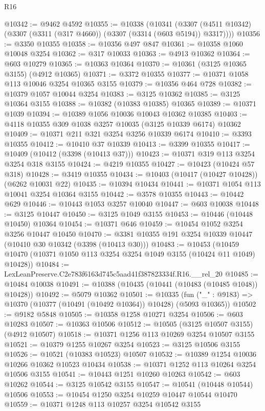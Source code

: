 \begin{lexlean}{R16}
\begin{coremodule}
@10342 := @9462 @4592
@10355 := @10338
    (@10341 (@3307 (@4511 @10342) (@3307 (@3311 (@317 @4660)) (@3307 (@3314 (@603 @5194)) @3317))))
@10356 := @3350 @10355
@10358 := @10356 @497 @847
@10361 := @10358 @1060 @10048 @3254
@10362 := @317 @10033
@10363 := @4913 @10362
@10364 := @603 @10279
@10365 := @10363 @10364
@10370 := @10361 (@3125 @10365 @3155) (@4912 @10365)
@10371 := @3372 @10355
@10377 := @10371 @1058 @113 @10046 @3254 @10365 @3155
@10379 := @10356 @464 @728
@10382 := @10379 @1057 @10044 @3254
@10383 := @3125 @10362
@10385 := @3125 @10364 @3155
@10388 := @10382 (@10383 @10385) @10365
@10389 := @10371 @1039
@10394 := @10389 @1056 @10036 @10043 @10362 @10385
@10403 := @4118 @10355 @309 @1038 @3257 @10035 (@3125 @10339 @6174) @10362
@10409 := @10371 @211 @321 @3254 @3256 @10339 @6174
@10410 := @3393 @10355
@10412 := @10410 @37 @10339
@10413 := @3399 @10355
@10417 := @10409 (@10412 (@3398 (@10413 @37)))
@10423 := @10371 @319 @113 @3254 @3254 @318 @3155
@10424 := @4219 @10355
@10427 := @10423 (@10424 @57 @318)
@10428 := @3419 @10355
@10434 := @10403 (@10417 (@10427 @10428)) (@6262 @10031 @22)
@10435 := @10394 @10434
@10441 := @10371 @1054 @113 @10041 @3254 @10364 @3155
@10442 := @3578 @10355
@10443 := @10442 @629
@10446 := @10443 @1053 @3257 @10040
@10447 := @603 @10038
@10448 := @3125 @10447
@10450 := @3125 @1049 @3155
@10453 := @10446 (@10448 @10450) @10364
@10454 := @10371 @646
@10459 := @10454 @1052 @3254 @3256 @10447 @10450
@10470 := @3381 @10355 @191 @3254 @10339 @10447 (@10410 @30 @10342 (@3398 (@10413 @30)))
@10483 := @10453
    (@10459 @10470 (@10371 @1050 @113 @3254 @3254 @1049 @3155 (@10424 @11 @1049) @10428))
@10484 := LexLeanPreserve.C2e783f6163d745c5aad41f387823334f.R16.__rel_20
@10485 := @10484 @10038
@10491 := @10388 (@10435 (@10441 (@10483 (@10485 @1048)) @10428))
@10492 := @5079 @10362
@10501 := @10335
    (fun ("_" : @9183) => @10370 (@10377 (@10491 (@10492 @10364)) @10428) (@5093 @10365))
@10502 := @9182 @5848
@10505 := @10358 @1258 @10271 @3254
@10506 := @603 @10283
@10507 := @10363 @10506
@10512 := @10505 (@3125 @10507 @3155) (@4912 @10507)
@10518 := @10371 @1256 @113 @10269 @3254 @10507 @3155
@10521 := @10379 @1255 @10267 @3254
@10523 := @3125 @10506 @3155
@10526 := @10521 (@10383 @10523) @10507
@10532 := @10389 @1254 @10036 @10266 @10362 @10523 @10434
@10538 := @10371 @1252 @113 @10264 @3254 @10506 @3155
@10541 := @10443 @1251 @10260 @10263
@10542 := @603 @10262
@10544 := @3125 @10542 @3155
@10547 := @10541 (@10448 @10544) @10506
@10553 := @10454 @1250 @3254 @10259 @10447 @10544 @10470
@10559 := @10371 @1248 @113 @10257 @3254 @10542 @3155

\end{coremodule}
\end{lexlean}
